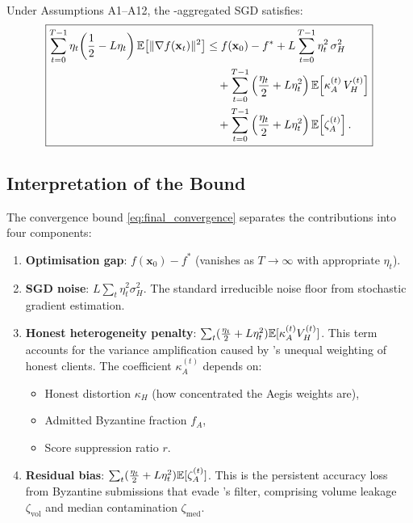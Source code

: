 \documentclass[../main]{subfiles}
\begin{document}
\begin{theorem}
\hfill \\\label{thm:convergence}
Under Assumptions A1--A12, the \aegis{}-aggregated SGD satisfies:
\begin{equation}
\boxed{
\begin{aligned}
    \sum_{t=0}^{T-1} \eta_t\!\left(\frac{1}{2} - L\eta_t\right) \mathbb{E}\!\left[\|\nabla f(\mathbf{x}_t)\|^2\right]
    &\leq f(\mathbf{x}_0) - f^*
    + L\sum_{t=0}^{T-1}\eta_t^2\,\sigma_H^2 \\
    &\quad + \sum_{t=0}^{T-1}\left(\frac{\eta_t}{2} + L\eta_t^2\right)\mathbb{E}\!\left[\kappa_A^{(t)}\, V_H^{(t)}\right] \\
    &\quad + \sum_{t=0}^{T-1}\left(\frac{\eta_t}{2} + L\eta_t^2\right)\mathbb{E}\!\left[\zeta_A^{(t)}\right].
\end{aligned}
}
\label{eq:final_convergence}
\end{equation}
\end{theorem}

\subsection{Interpretation of the Bound}

The convergence bound \eqref{eq:final_convergence} separates the contributions into four components:

\begin{enumerate}
    \item \textbf{Optimisation gap}: $f(\mathbf{x}_0) - f^*$ (vanishes as $T \to \infty$ with appropriate $\eta_t$).
    
    \item \textbf{SGD noise}: $L\sum_{t}\eta_t^2\sigma_H^2$. The standard irreducible noise floor from stochastic gradient estimation.
    
    \item \textbf{Honest heterogeneity penalty}: $\sum_t(\frac{\eta_t}{2} + L\eta_t^2)\mathbb{E}[\kappa_A^{(t)} V_H^{(t)}]$.
    This term accounts for the variance amplification caused by \aegis{}'s unequal weighting of honest clients. The coefficient $\kappa_A^{(t)}$ depends on:
    \begin{itemize}
        \item Honest distortion $\kappa_H$ (how concentrated the Aegis weights are),
        \item Admitted Byzantine fraction $f_A$,
        \item Score suppression ratio $r$.
    \end{itemize}
    
    \item \textbf{Residual bias}: $\sum_t(\frac{\eta_t}{2} + L\eta_t^2)\mathbb{E}[\zeta_A^{(t)}]$.
    This is the persistent accuracy loss from Byzantine submissions that evade \aegis{}'s filter, comprising volume leakage $\zeta_{\text{vol}}$ and median contamination $\zeta_{\text{med}}$.
\end{enumerate}
\end{document}
